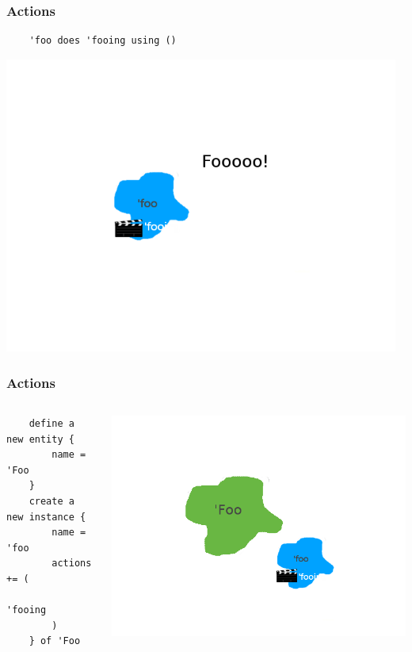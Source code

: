 \documentclass{beamer}
\begin{document}
\begin{frame}[fragile]
    \frametitle{Actions}
    \begin{lstlisting}
    'foo does 'fooing using ()
    \end{lstlisting}
    \pause
    \includegraphics[width=13cm]{foo-inst-fooing}
\end{frame}

\begin{frame}[fragile]
    \frametitle{Actions}
    \begin{columns}[T]
    \begin{column}[T]{5cm}
    \begin{lstlisting}
    define a new entity {
        name = 'Foo
    }
    create a new instance {
        name = 'foo
        actions += (
            'fooing
        )
    } of 'Foo
    \end{lstlisting}
    \end{column}
    \begin{column}[T]{4cm}
    \includegraphics[scale=0.4, trim=8cm 0cm 8cm 0cm]{foo-Foo-fooing}
    \end{column}
    \end{columns}
\end{frame}
\end{document}

